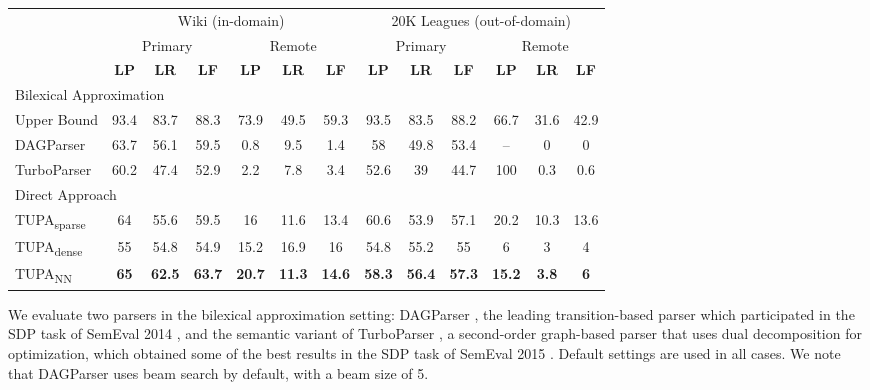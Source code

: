 \documentclass[11pt,a4paper]{article}
\newcommand{\parser}[1]{TUPA\textsubscript{#1}}
\begin{document}
\begin{table*}[ht]
\begin{tabular}{l|ccc|ccc||ccc|ccc}
& \multicolumn{6}{c||}{Wiki (in-domain)} & \multicolumn{6}{c}{20K Leagues (out-of-domain)} \\
& \multicolumn{3}{c|}{Primary} & \multicolumn{3}{c||}{Remote}
& \multicolumn{3}{c|}{Primary} & \multicolumn{3}{c}{Remote} \\
& \textbf{LP} & \textbf{LR} & \textbf{LF} & \textbf{LP} & \textbf{LR} & \textbf{LF}
& \textbf{LP} & \textbf{LR} & \textbf{LF} & \textbf{LP} & \textbf{LR} & \textbf{LF} \\
\hline
\multicolumn{4}{l}{\rule{0pt}{2ex} \footnotesize Bilexical Approximation} \\
Upper Bound %
& 93.4 & 83.7 & 88.3 & 73.9 & 49.5 & 59.3
& 93.5 & 83.5 & 88.2 & 66.7 & 31.6 & 42.9 \vspace{.1cm} \\
DAGParser
& 63.7 & 	56.1	 & 59.5	 & 0.8	 & 9.5	 &  1.4
& 58	 & 49.8	 & 53.4 & -- & 0 & 0 \\
TurboParser
& 60.2	 & 47.4	 & 52.9	 & 2.2	 & 7.8	 &  3.4
& 52.6	 & 39	 & 44.7	 & 100	 & 0.3	 & 0.6 \\
\hline
\multicolumn{4}{l}{\rule{0pt}{2ex} \footnotesize Direct Approach} \\
\parser{sparse}
& 64 & 55.6 & 59.5 & 16 & 11.6 & 13.4 
& 60.6 & 53.9 & 57.1 & 20.2 & 10.3 & 13.6 \\
\parser{dense} 
& 55 & 54.8 & 54.9 & 15.2 & 16.9 & 16 
& 54.8 & 55.2 & 55 & 6 & 3 & 4 \\
\parser{NN}
& {\bf 65} & {\bf 62.5} & {\bf 63.7} & {\bf 20.7} & {\bf 11.3} & {\bf 14.6}
& {\bf 58.3} & {\bf 56.4} & {\bf 57.3} & {\bf 15.2} & {\bf 3.8} & {\bf 6}
\end{tabular}
\caption{\label{table:results}
  Main experimental results in percents, on the \textit{Wiki} test set (left, in-domain)
  and the \textit{20K Leagues} set (right, out-of-domain).
  Columns correspond to labeled precision, recall and F-score for the different parsers,
  for both primary and remote edges.
  Top: results for DAGParser and TurboParser, after conversion to bilexical DAGs.
  Bottom: results for our \parser{}, trained on the original UCCA graphs, using each of the
  three classifiers.
  \parser{NN} obtains the highest scores in all metrics, surpassing the bilexical parsers
  and the other classifiers.
}
\end{table*}

We evaluate two parsers in the bilexical approximation setting:
DAGParser \cite{ribeyre-villemontedelaclergerie-seddah:2014:SemEval}, the leading transition-based parser which participated in the SDP task of SemEval 2014 \cite{oepen2014semeval},
and the semantic variant of TurboParser \cite{almeida-martins:2015:SemEval},
a second-order graph-based parser that uses dual decomposition for optimization,
which obtained some of the best results in the SDP task of SemEval 2015 \cite{oepen2015semeval}. Default settings are used in all cases.
We note that DAGParser uses beam search by default, with a beam size of 5.
\end{document}
